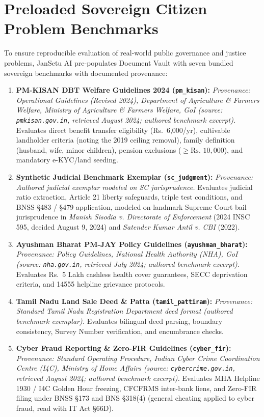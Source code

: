 \documentclass[12pt,a4paper,oneside]{report}
\begin{document}
\section{Preloaded Sovereign Citizen Problem Benchmarks}
To ensure reproducible evaluation of real-world public governance and justice problems, JanSetu AI pre-populates Document Vault with seven bundled sovereign benchmarks with documented provenance:
\begin{enumerate}[itemsep=2pt]
    \item \textbf{PM-KISAN DBT Welfare Guidelines 2024 (\texttt{pm\_kisan}):} \textit{Provenance: Operational Guidelines (Revised 2024), Department of Agriculture \& Farmers Welfare, Ministry of Agriculture \& Farmers Welfare, GoI (source: \texttt{pmkisan.gov.in}, retrieved August 2024; authored benchmark excerpt).} Evaluates direct benefit transfer eligibility (Rs.~6,000/yr), cultivable landholder criteria (noting the 2019 ceiling removal), family definition (husband, wife, minor children), pension exclusions ($\ge \text{Rs.~}10,000$), and mandatory e-KYC/land seeding.
    \item \textbf{Synthetic Judicial Benchmark Exemplar (\texttt{sc\_judgment}):} \textit{Provenance: Authored judicial exemplar modeled on SC jurisprudence.} Evaluates judicial ratio extraction, Article 21 liberty safeguards, triple test conditions, and BNSS \S 483 / \S 479 application, modeled on landmark Supreme Court bail jurisprudence in \textit{Manish Sisodia v. Directorate of Enforcement} (2024 INSC 595, decided August 9, 2024) and \textit{Satender Kumar Antil v. CBI} (2022).
    \item \textbf{Ayushman Bharat PM-JAY Policy Guidelines (\texttt{ayushman\_bharat}):} \textit{Provenance: Policy Guidelines, National Health Authority (NHA), GoI (source: \texttt{nha.gov.in}, retrieved July 2024; authored benchmark excerpt).} Evaluates Rs.~5 Lakh cashless health cover guarantees, SECC deprivation criteria, and 14555 helpline grievance protocols.
    \item \textbf{Tamil Nadu Land Sale Deed \& Patta (\texttt{tamil\_pattiram}):} \textit{Provenance: Standard Tamil Nadu Registration Department deed format (authored benchmark exemplar).} Evaluates bilingual deed parsing, boundary consistency, Survey Number verification, and encumbrance checks.
    \item \textbf{Cyber Fraud Reporting \& Zero-FIR Guidelines (\texttt{cyber\_fir}):} \textit{Provenance: Standard Operating Procedure, Indian Cyber Crime Coordination Centre (I4C), Ministry of Home Affairs (source: \texttt{cybercrime.gov.in}, retrieved August 2024; authored benchmark excerpt).} Evaluates MHA Helpline 1930 / I4C Golden Hour freezing, CFCFRMS inter-bank liens, and Zero-FIR filing under BNSS \S 173 and BNS \S 318(4) (general cheating applied to cyber fraud, read with IT Act \S 66D).

\end{enumerate}
\end{document}
